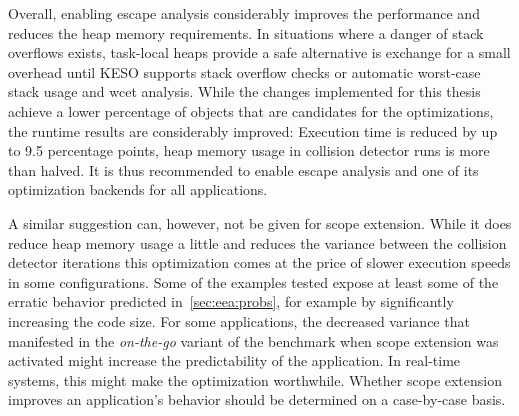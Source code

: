 		Overall, enabling escape analysis considerably improves the performance and reduces the heap memory requirements. In
		situations where a danger of stack overflows exists, task-local heaps provide a safe alternative is exchange for
		a small overhead until KESO supports stack overflow checks or automatic worst-case stack usage and \gls{wcet}
		analysis. While the changes implemented for this thesis achieve a lower percentage of objects that are candidates
		for the optimizations, the runtime results are considerably improved: Execution time is reduced by up to 9.5
		percentage points, heap memory usage in collision detector runs is more than halved. It is thus recommended to
		enable escape analysis and one of its optimization backends for all applications.

		A similar suggestion can, however, not be given for scope extension. While it does reduce heap memory usage a little
		and reduces the variance between the collision detector iterations this optimization comes at the price of slower
		execution speeds in some configurations. Some of the examples tested expose at least some of the erratic behavior
		predicted in~\cref{sec:eea:probs}, for example by significantly increasing the code size. For some applications, the
		decreased variance that manifested in the \emph{on-the-go} variant of the benchmark when scope extension was
		activated might increase the predictability of the application. In real-time systems, this might make the
		optimization worthwhile. Whether scope extension improves an application's behavior should be determined on
		a case-by-case basis.
